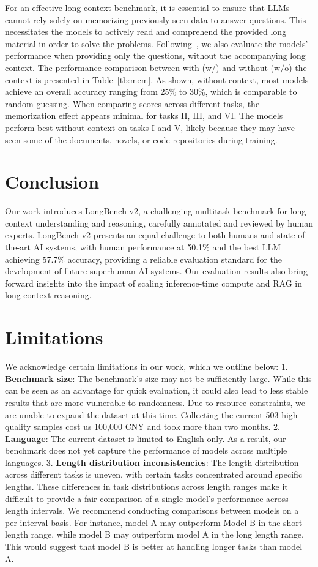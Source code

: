 For an effective long-context benchmark, it is essential to ensure that LLMs cannot rely solely on memorizing previously seen data to answer questions. 
This necessitates the models to actively read and comprehend the provided long material in order to solve the problems.
Following~\citet{bai2024longbench}, we also evaluate the models' performance when providing only the questions, without the accompanying long context.
The performance comparison between with (w/) and without (w/o) the context is presented in Table~\ref{tb:mem}.
As shown, without context, most models achieve an overall accuracy ranging from 25\% to 30\%, which is comparable to random guessing. When comparing scores across different tasks, the memorization effect appears minimal for tasks II, III, and VI.
The models perform best without context on tasks I and V, likely because they may have seen some of the documents, novels, or code repositories during training.
\section{Conclusion}
Our work introduces LongBench v2, a challenging multitask benchmark for long-context understanding and reasoning, carefully annotated and reviewed by human experts.
LongBench v2 presents an equal challenge to both humans and state-of-the-art AI systems, with human performance at 50.1\% and the best LLM achieving 57.7\% accuracy, providing a reliable evaluation standard for the development of future superhuman AI systems.
Our evaluation results also bring forward insights into the impact of scaling inference-time compute and RAG in long-context reasoning.
\section{Limitations}
We acknowledge certain limitations in our work, which we outline below:
1. \textbf{Benchmark size}: The benchmark's size may not be sufficiently large. While this can be seen as an advantage for quick evaluation, it could also lead to less stable results that are more vulnerable to randomness. Due to resource constraints, we are unable to expand the dataset at this time. Collecting the current 503 high-quality samples cost us 100,000 CNY and took more than two months.
2. \textbf{Language}: The current dataset is limited to English only. As a result, our benchmark does not yet capture the performance of models across multiple languages.
3. \textbf{Length distribution inconsistencies}: The length distribution across different tasks is uneven, with certain tasks concentrated around specific lengths. These differences in task distributions across length ranges make it difficult to provide a fair comparison of a single model's performance across length intervals. We recommend conducting comparisons between models on a per-interval basis. For instance, model A may outperform Model B in the short length range, while model B may outperform model A in the long length range. This would suggest that model B is better at handling longer tasks than model A.

